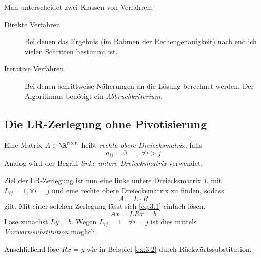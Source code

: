\documentclass[a4paper]{scrartcl}
\numberwithin{equation}{section}
\begin{document}
Man unterscheidet zwei Klassen von Verfahren:
\begin{description}
\item[Direkte Verfahren]
Bei denen das Ergebnis (im Rahmen der Rechengenauigkeit) nach endlich vielen Schritten bestimmt ist.
\item[Iterative Verfahren]
Bei denen schrittweise Näherungen an die Lösung berechnet werden. 
Der Algorithmus benötigt ein \emph{Abbruchkriterium}.
\end{description}


\subsection{Die LR-Zerlegung ohne Pivotisierung}

\begin{df}
\label{df:3.3}
Eine Matrix $A\in \R^{n\times n}$ heißt \emph{rechte obere Dreiecksmatrix}, falls 
\[
a_{ij}=0 \qquad \forall i>j
\]
Analog wird der Begriff \emph{linke untere Dreiecksmatrix} verwendet.
\end{df}

Ziel der LR-Zerlegung ist nun eine linke untere Dreiecksmatrix $L$ mit $L_{ij}=1, \forall i=j$ und eine rechte obere Dreiecksmatrix zu finden, sodass
\begin{equation}
\label{eq:3.3}
A=L\cdot R
\end{equation}
gilt.
Mit einer solchen Zerlegung lässt sich \eqref{eq:3.1} einfach lösen.
\[
Ax= LR x=b
\]
Löse zunächst $Ly=b$.
Wegen $L_{ij}=1 \quad \forall i=j$ ist dies mittels \emph{Vorwärtssubstitution} möglich.

Anschließend löse $Rx=y$ wie in Beispiel \ref{ex:3.2} durch Rückwärtssubstitution.
\end{document}
